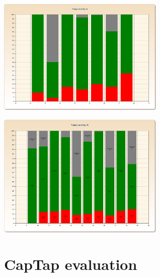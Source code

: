 \begin{minipage}{\linewidth}
\centering
\includegraphics[width=0.6\textwidth]{images/workact_day2}
\label{fig:workact_day2}
\end{minipage}

\begin{minipage}{\linewidth}
\centering
\includegraphics[width=0.6\textwidth]{images/workact_day3}
\label{fig:workact_day3}
\end{minipage}


\section{CapTap evaluation}
